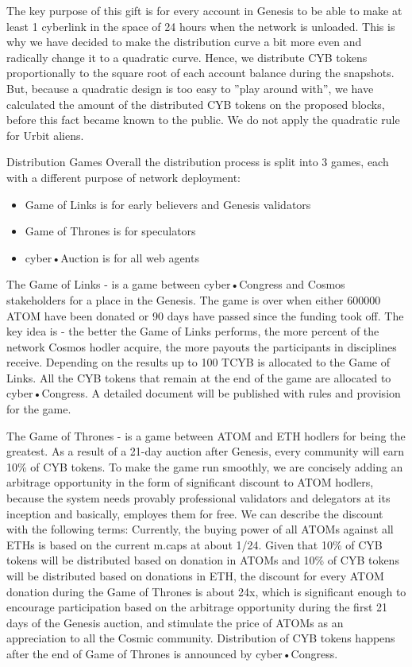 \documentclass[8pt,oneside]{amsart}
\makeatletter
\renewcommand\subsection{\@startsection{subsection}
                                    {2}{\z@}
                                    {-3.25ex\@plus -1ex \@minus -.2ex}
                                    {0ex \@plus .2ex}
                                    {\play\Large}
                        }
\newcommand{\titleSection}[1]{\subsection{#1}}
\makeatother
\begin{document}
The key purpose of this gift is for every account in Genesis to be able to make at least 1 cyberlink in the space of 24 hours when the network is unloaded. This is why we have decided to make the distribution curve a bit more even and radically change it to a quadratic curve. Hence, we distribute CYB tokens proportionally to the square root of each account balance during the snapshots. But, because a quadratic design is too easy to ”play around with”, we have calculated the amount of the distributed CYB tokens on the proposed blocks, before this fact became known to the public. We do not apply the quadratic rule for Urbit aliens.

\titleSection{Distribution Games}\label{Distribution Games}
Overall the distribution process is split into 3 games, each with a different purpose of network deployment:
\begin{itemize}
\item Game of Links is for early believers and Genesis validators
\item Game of Thrones is for speculators
\item cyber•Auction is for all web agents
\end{itemize}

The Game of Links - is a game between cyber•Congress and Cosmos stakeholders for a place in the Genesis. The game is over when either 600000 ATOM have been donated or 90 days have passed since the funding took off. The key idea is - the better the Game of Links performs, the more percent of the network Cosmos hodler acquire, the more payouts the participants in disciplines receive. Depending on the results up to 100 TCYB is allocated to the Game of Links. All the CYB tokens that remain at the end of the game are allocated to cyber•Congress. A detailed document will be published with rules and provision for the game.

The Game of Thrones - is a game between ATOM and ETH hodlers for being the greatest. As a result of a 21-day auction after Genesis, every community will earn 10\% of CYB tokens. To make the game run smoothly, we are concisely adding an arbitrage opportunity in the form of significant discount to ATOM hodlers, because the system needs provably professional validators and delegators at its inception and basically, employes them for free. We can describe the discount with the following terms: Currently, the buying power of all ATOMs against all ETHs is based on the current m.caps at about 1/24. Given that 10\% of CYB tokens will be distributed based on donation in ATOMs and 10\% of CYB tokens will be distributed based on donations in ETH, the discount for every ATOM donation during the Game of Thrones is about 24x, which is significant enough to encourage participation based on the arbitrage opportunity during the first 21 days of the Genesis auction, and stimulate the price of ATOMs as an appreciation to all the Cosmic community. Distribution of CYB tokens happens after the end of Game of Thrones is announced by cyber•Congress.
\end{document}
